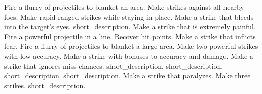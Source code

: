 \begin{spelllist}
 Fire a flurry of projectiles to blanket an area.
 Make strikes against all nearby foes.
 Make rapid ranged strikes while staying in place.
 Make a strike that bleeds into the target's eyes.
 short_description.
 Make a strike that is extremely painful.
 Fire a powerful projectile in a line.
 Recover hit points.
 Make a strike that inflicts fear.
 Fire a flurry of projectiles to blanket a large area.
 Make two powerful strikes with low accuracy.
 Make a strike with bonuses to accuracy and damage.
 Make a strike that ignores miss chances.
 short_description.
 short_description.
 short_description.
 short_description.
 Make a strike that paralyzes.
 Make three strikes.
 short_description.
\end{spelllist}



\small
